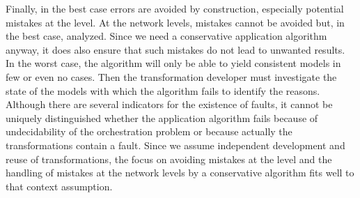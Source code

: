 Finally, in the best case errors are avoided by construction, especially potential mistakes at the \leveltransformation level.
At the network levels, mistakes cannot be avoided but, in the best case, analyzed.
Since we need a conservative application algorithm anyway, it does also ensure that such mistakes do not lead to unwanted results.
In the worst case, the algorithm will only be able to yield consistent models in few or even no cases.
Then the transformation developer must investigate the state of the models with which the algorithm fails to identify the reasons.
Although there are several indicators for the existence of faults, it cannot be uniquely distinguished whether the application algorithm fails because of undecidability of the orchestration problem or because actually the transformations contain a fault.
Since we assume independent development and reuse of transformations, the focus on avoiding mistakes at the \leveltransformation level and the handling of mistakes at the network levels by a conservative algorithm fits well to that context assumption.





